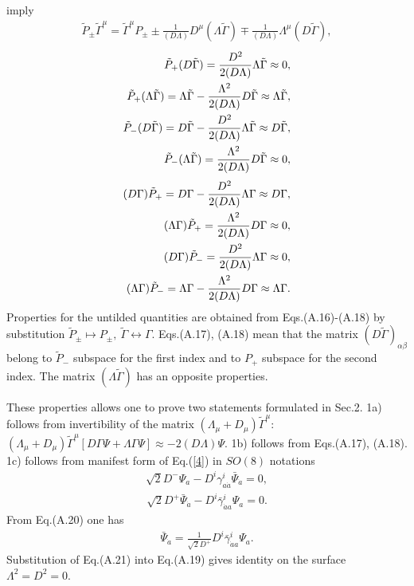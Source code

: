 \documentclass[a4paper]{article}
\begin{document}
imply
\begin{eqnarray}
\tilde P_{\pm}\tilde\Gamma^\mu=\tilde\Gamma^\mu P_{\pm}\pm
\frac{1}{(D\Lambda)}D^\mu(\Lambda\tilde\Gamma)\mp
\frac{1}{(D\Lambda)}\Lambda^\mu(D\tilde\Gamma), 
\end{eqnarray}
\begin{eqnarray}
\tilde P_+(D\tilde\Gamma)=
\frac{D^2}{2(D\Lambda)}\Lambda\tilde\Gamma\approx 0, \cr 
\tilde P_+(\Lambda\tilde\Gamma)=\Lambda\tilde\Gamma-
\frac{\Lambda^2}{2(D\Lambda)}D\tilde\Gamma
\approx\Lambda\tilde\Gamma, \cr
\tilde P_-(D\tilde\Gamma)=D\tilde\Gamma-
\frac{D^2}{2(D\Lambda)}\Lambda\tilde\Gamma\approx D\tilde\Gamma, \cr
\tilde P_-(\Lambda\tilde\Gamma)=
\frac{\Lambda^2}{2(D\Lambda)}D\tilde\Gamma\approx 0, 
\end{eqnarray}
\begin{eqnarray}
(D\Gamma)\tilde P_+=D\Gamma-
\frac{D^2}{2(D\Lambda)}\Lambda\Gamma\approx D\Gamma, \cr
(\Lambda\Gamma)\tilde P_+=
\frac{\Lambda^2}{2(D\Lambda)}D\Gamma\approx 0, \cr
(D\Gamma)\tilde P_-=
\frac{D^2}{2(D\Lambda)}\Lambda\Gamma\approx 0, \cr
(\Lambda\Gamma)\tilde P_-=\Lambda\Gamma-
\frac{\Lambda^2}{2(D\Lambda)}D\Gamma
\approx\Lambda\Gamma. 
\end{eqnarray}
Properties for the untilded quantities are obtained from 
Eqs.(A.16)-(A.18) by substitution $\tilde P_{\pm}\mapsto P_{\pm}, 
~ \tilde\Gamma\leftrightarrow\Gamma$.
Eqs.(A.17), (A.18) mean that the matrix $(D\tilde\Gamma)_{\alpha\beta}$ 
belong to $\tilde P_-$ subspace for the first index and to $P_+$ 
subspace for the second index. The matrix $(\Lambda\tilde\Gamma)$ has 
an opposite properties.

These properties allows one to prove two statements formulated in Sec.2. 
1a) follows from invertibility of the matrix
$(\Lambda_\mu+D_\mu){\tilde\Gamma^\mu}$: ~
$(\Lambda_\mu+D_\mu){\tilde\Gamma^\mu}[D\Gamma\Psi+
\Lambda\Gamma\Psi]\approx  
-2(D\Lambda)\Psi$. 1b) follows from Eqs.(A.17), (A.18). 1c) follows 
from manifest form of Eq.(\ref{4}) in $SO(8)$ notations
\begin{eqnarray}
\sqrt 2D^-\Psi_a-D^i\gamma^i_{a\dot a}\bar\Psi_{\dot a}=0, 
\end{eqnarray}
\begin{eqnarray} 
\sqrt 2D^+\bar\Psi_{\dot a}-D^i\bar\gamma^i_{\dot aa}\Psi_a=0.
\end{eqnarray}
From Eq.(A.20) one has 
\begin{eqnarray}
\bar\Psi_{\dot a}=\frac{1}{\sqrt 2D^+}D^i\bar\gamma^i_{\dot aa}\Psi_a.
\end{eqnarray}
Substitution of Eq.(A.21) into Eq.(A.19) gives identity on the surface 
$\Lambda^2=D^2=0$.
\end{document}
